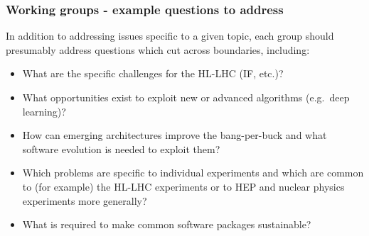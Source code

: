 \begin{frame}
\frametitle{Working groups - example questions to address}

In addition to addressing issues specific to a given topic,
each group should presumably address questions which cut across boundaries,
including:
\begin{itemize}
\item
  What are the specific challenges for the HL-LHC (IF, etc.)?
\item
  What opportunities exist to exploit new or advanced
  algorithms (e.g.\ deep learning)?
\item
  How can emerging architectures improve the bang-per-buck and what
  software evolution is needed to exploit them?
\item
  Which problems are specific to individual experiments and which
  are common to (for example) the HL-LHC experiments or to HEP
  and nuclear physics experiments
  more generally?
\item
  What is required to make common software packages sustainable?
\end{itemize}


\end{frame}


